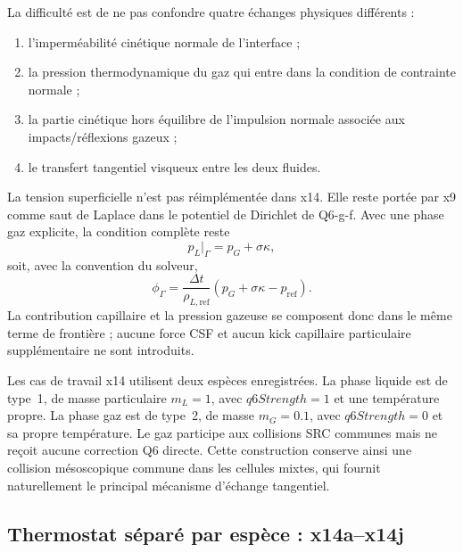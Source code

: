 \documentclass[11pt,a4paper]{article}
\begin{document}
La difficulté est de ne pas confondre quatre échanges physiques différents :
\begin{enumerate}[label=(\roman*)]
  \item l'imperméabilité cinétique normale de l'interface ;
  \item la pression thermodynamique du gaz qui entre dans la condition de contrainte normale ;
  \item la partie cinétique hors équilibre de l'impulsion normale associée aux impacts/réflexions gazeux ;
  \item le transfert tangentiel visqueux entre les deux fluides.
\end{enumerate}
La tension superficielle n'est pas réimplémentée dans x14. Elle reste portée par x9 comme saut de Laplace dans le potentiel de Dirichlet de Q6-g-f. Avec une phase gaz explicite, la condition complète reste
\begin{equation}
  p_L\big|_\Gamma = p_G + \sigma\kappa,
\end{equation}
soit, avec la convention du solveur,
\begin{equation}
  \phi_\Gamma =
  \frac{\Delta t}{\rho_{L,\mathrm{ref}}}
  \left(p_G + \sigma\kappa - p_{\mathrm{ref}}\right).
  \label{eq:x14-dirichlet}
\end{equation}
La contribution capillaire et la pression gazeuse se composent donc dans le même terme de frontière ; aucune force CSF et aucun kick capillaire particulaire supplémentaire ne sont introduits.

Les cas de travail x14 utilisent deux espèces enregistrées. La phase liquide est de type~1, de masse particulaire $m_L=1$, avec $q6Strength=1$ et une température propre. La phase gaz est de type~2, de masse $m_G=0.1$, avec $q6Strength=0$ et sa propre température. Le gaz participe aux collisions SRC communes mais ne reçoit aucune correction Q6 directe. Cette construction conserve ainsi une collision mésoscopique commune dans les cellules mixtes, qui fournit naturellement le principal mécanisme d'échange tangentiel.

\subsection{Thermostat séparé par espèce : x14a--x14j}
\end{document}
